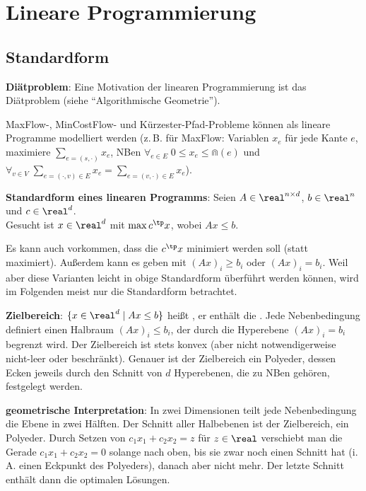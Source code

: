 \section{%
    Lineare Programmierung%
}

\subsection{%
    Standardform%
}

\textbf{Diätproblem}:
Eine Motivation der linearen Programmierung ist das Diätproblem
(siehe "`Algorithmische Geometrie"').

MaxFlow-, MinCostFlow- und Kürzester-Pfad-Probleme können als lineare Programme modelliert werden
(z.\,B. für MaxFlow:
Variablen $x_e$ für jede Kante $e$,
maximiere $\sum_{e=(s,\cdot)} x_e$,
NBen $\forall_{e \in E}\; 0 \le x_e \le \Cap(e)$ und
$\forall_{v \in V}\; \sum_{e = (\cdot,v) \in E} x_e = \sum_{e = (v,\cdot) \in E} x_e$).

\linie

\textbf{Standardform eines linearen Programms}:
Seien $A \in \real^{n \times d}$, $b \in \real^n$ und $c \in \real^d$.\\
Gesucht ist $x \in \real^d$ mit $\max c^\tp x$, wobei $Ax \le b$.

Es kann auch vorkommen, dass die  $c^\tp x$ minimiert werden soll
(statt maximiert).
Außerdem kann es  geben mit $(Ax)_i \ge b_i$ oder $(Ax)_i = b_i$.
Weil aber diese Varianten leicht in obige Standardform überführt werden können,
wird im Folgenden meist nur die Standardform betrachtet.

\textbf{Zielbereich}:
$\{x \in \real^d \;|\; Ax \le b\}$ heißt ,
er enthält die .
Jede Nebenbedingung definiert einen Halbraum $(Ax)_i \le b_i$, der durch die Hyperebene
$(Ax)_i = b_i$ begrenzt wird.
Der Zielbereich ist stets konvex (aber nicht notwendigerweise nicht-leer oder beschränkt).
Genauer ist der Zielbereich ein Polyeder, dessen Ecken jeweils durch den Schnitt von
$d$ Hyperebenen, die zu NBen gehören, festgelegt werden.

\textbf{geometrische Interpretation}:
In zwei Dimensionen teilt jede Nebenbedingung die Ebene in zwei Hälften.
Der Schnitt aller Halbebenen ist der Zielbereich, ein Polyeder.
Durch Setzen von $c_1 x_1 + c_2 x_2 = z$ für $z \in \real$ verschiebt man die Gerade
$c_1 x_1 + c_2 x_2 = 0$ solange nach oben, bis sie zwar noch einen Schnitt hat
(i.\,A. einen Eckpunkt des Polyeders), danach aber nicht mehr.
Der letzte Schnitt enthält dann die optimalen Lösungen.

